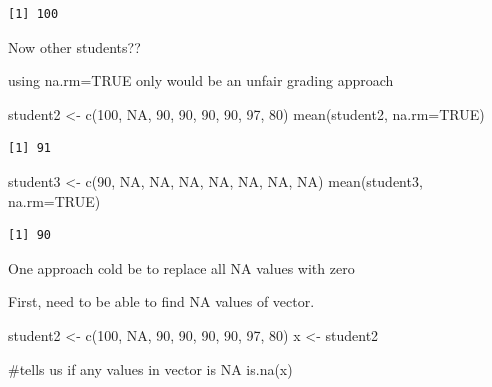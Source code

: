 \documentclass[
  letterpaper,
  DIV=11,
  numbers=noendperiod]{scrartcl}
\newenvironment{Shaded}{\begin{snugshade}}{\end{snugshade}}
\newcommand{\AttributeTok}[1]{\textcolor[rgb]{0.40,0.45,0.13}{#1}}
\newcommand{\CommentTok}[1]{\textcolor[rgb]{0.37,0.37,0.37}{#1}}
\newcommand{\ConstantTok}[1]{\textcolor[rgb]{0.56,0.35,0.01}{#1}}
\newcommand{\DecValTok}[1]{\textcolor[rgb]{0.68,0.00,0.00}{#1}}
\newcommand{\FunctionTok}[1]{\textcolor[rgb]{0.28,0.35,0.67}{#1}}
\newcommand{\NormalTok}[1]{\textcolor[rgb]{0.00,0.23,0.31}{#1}}
\newcommand{\OtherTok}[1]{\textcolor[rgb]{0.00,0.23,0.31}{#1}}
\begin{document}
\begin{verbatim}
[1] 100
\end{verbatim}

Now other students??

using na.rm=TRUE only would be an unfair grading approach

\begin{Shaded}
\begin{Highlighting}[]
\NormalTok{student2 }\OtherTok{\textless{}{-}} \FunctionTok{c}\NormalTok{(}\DecValTok{100}\NormalTok{, }\ConstantTok{NA}\NormalTok{, }\DecValTok{90}\NormalTok{, }\DecValTok{90}\NormalTok{, }\DecValTok{90}\NormalTok{, }\DecValTok{90}\NormalTok{, }\DecValTok{97}\NormalTok{, }\DecValTok{80}\NormalTok{)}
\FunctionTok{mean}\NormalTok{(student2, }\AttributeTok{na.rm=}\ConstantTok{TRUE}\NormalTok{)}
\end{Highlighting}
\end{Shaded}

\begin{verbatim}
[1] 91
\end{verbatim}

\begin{Shaded}
\begin{Highlighting}[]
\NormalTok{student3 }\OtherTok{\textless{}{-}} \FunctionTok{c}\NormalTok{(}\DecValTok{90}\NormalTok{, }\ConstantTok{NA}\NormalTok{, }\ConstantTok{NA}\NormalTok{, }\ConstantTok{NA}\NormalTok{, }\ConstantTok{NA}\NormalTok{, }\ConstantTok{NA}\NormalTok{, }\ConstantTok{NA}\NormalTok{, }\ConstantTok{NA}\NormalTok{)}
\FunctionTok{mean}\NormalTok{(student3, }\AttributeTok{na.rm=}\ConstantTok{TRUE}\NormalTok{)}
\end{Highlighting}
\end{Shaded}

\begin{verbatim}
[1] 90
\end{verbatim}

One approach cold be to replace all NA values with zero

First, need to be able to find NA values of vector.

\begin{Shaded}
\begin{Highlighting}[]
\NormalTok{student2 }\OtherTok{\textless{}{-}} \FunctionTok{c}\NormalTok{(}\DecValTok{100}\NormalTok{, }\ConstantTok{NA}\NormalTok{, }\DecValTok{90}\NormalTok{, }\DecValTok{90}\NormalTok{, }\DecValTok{90}\NormalTok{, }\DecValTok{90}\NormalTok{, }\DecValTok{97}\NormalTok{, }\DecValTok{80}\NormalTok{)}
\NormalTok{x }\OtherTok{\textless{}{-}}\NormalTok{ student2}

\CommentTok{\#tells us if any values in vector is NA}
\FunctionTok{is.na}\NormalTok{(x)}
\end{Highlighting}
\end{Shaded}
\end{document}
